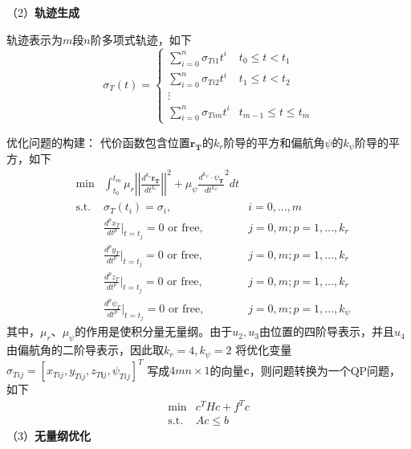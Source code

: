 （2）\textbf{轨迹生成}


轨迹表示为$m$段$n$阶多项式轨迹，如下
\begin{equation}
    \sigma_T(t)=\left\{\begin{array}{cc}\sum_{i=0}^n\sigma_{Ti1}t^i&t_0\leq t<t_1\\\sum_{i=0}^n\sigma_{Ti2}t^i&t_1\leq t<t_2\\\vdots\\\sum_{i=0}^n\sigma_{Tim}t^i&t_{m-1}\leq t\leq t_m\end{array}\right.
\end{equation}


优化问题的构建：
代价函数包含位置$\mathbf{r_T}$的$k_r$阶导的平方和偏航角$\psi$的$k_\psi$阶导的平方，如下
\begin{equation}
    \begin{aligned}\label{costfun}
        &\min&\int_{t_0}^{t_m}\mu_r\left|\left|\frac{d^{k_r}\mathbf{r_T}}{dt^{k_r}}\right|\right|^2+\mu_\psi\frac{d^{k_\psi}\cdot\psi_\mathbf{T}}{dt^{k_\psi}}^2dt&\\
        &\text{s.t.}&\sigma_T(t_i)=\sigma_i,&i=0,...,m\\
        & &\frac{d^px_T}{dt^p}|_{t=t_j}=0\text{ or free},&j=0,m; p=1,...,k_r\\
        & &\frac{d^py_T}{dt^p}|_{t=t_j}=0\text{ or free},&j=0,m; p=1,...,k_r\\
        & &\frac{d^pz_T}{dt^p}|_{t=t_j}=0\text{ or free},&j=0,m; p=1,...,k_r\\
        & &\frac{d^p\psi_T}{dt^p}|_{t=t_j}=0\text{ or free},&j=0,m; p=1,...,k_\psi
    \end{aligned}
\end{equation}
其中，$\mu_r$、$\mu_\psi$的作用是使积分量无量纲。由于$u_2,u_3$由位置的四阶导表示，并且$u_4$由偏航角的二阶导表示，因此取$k_r=4,k_\psi=2$
将优化变量$\sigma_{Tij}=[x_{Tij},y_{Tij},z_{T\boldsymbol{i}j},\psi_{Tij}]^T$
写成$4mn\times 1$的向量$\mathbf{c}$，则问题转换为一个QP问题，如下
\begin{equation}
    \begin{array}{cc}\min&c^THc+f^Tc\\\mathrm{s.t.}&Ac\leq b\end{array}
\end{equation}
（3）\textbf{无量纲优化}


